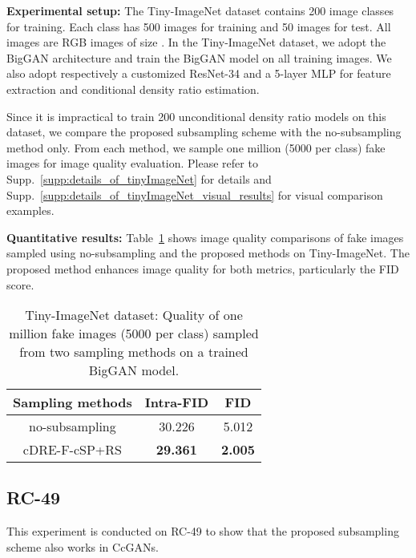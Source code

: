 \documentclass[10pt, twocolumn]{article}
\theoremstyle{definition}
\begin{document}
{\setlength{\parindent}{0cm}\textbf{Experimental setup:}} The Tiny-ImageNet dataset \cite{Le2015TinyIV} contains 200 image classes for training. Each class has 500 images for training and 50 images for test. All images are RGB images of size . In the Tiny-ImageNet dataset, we adopt the BigGAN architecture and train the BigGAN model on all training images. We also adopt respectively a customized ResNet-34 and a 5-layer MLP for feature extraction and conditional density ratio estimation. 

Since it is impractical to train 200 unconditional density ratio models \cite{ding2020subsampling} on this dataset, we compare the proposed subsampling scheme with the no-subsampling method only. From each method, we sample one million (5000 per class) fake images for image quality evaluation. Please refer to Supp.\ \ref{supp:details_of_tinyImageNet} for details and Supp.\ \ref{supp:details_of_tinyImageNet_visual_results} for visual comparison examples. 


{\setlength{\parindent}{0cm}\textbf{Quantitative results:}} Table~\ref{tab:TinyImageNet_compare} shows image quality comparisons of fake images sampled using no-subsampling and the proposed methods on Tiny-ImageNet. The proposed method enhances image quality for both metrics, particularly the FID score.         

\begin{table}[!htbp]
	\caption{Tiny-ImageNet dataset: Quality of one million fake images (5000 per class) sampled from two sampling methods on a trained BigGAN model.}
	\centering
	\begin{adjustbox}{width=0.27\textwidth}
		\begin{tabular}{c|c|c}
			\toprule
			Sampling methods & Intra-FID & FID   \\ \hline
			no-subsampling   & 30.226    & 5.012 \\ \hline
			cDRE-F-cSP+RS     & \textbf{29.361}    & \textbf{2.005} \\ 
			\bottomrule
		\end{tabular}
	\end{adjustbox}
	\label{tab:TinyImageNet_compare}
\end{table}

\subsection{RC-49}\label{sec:exp_rc49}
This experiment is conducted on RC-49 to show that the proposed subsampling scheme also works in CcGANs.   
\end{document}
